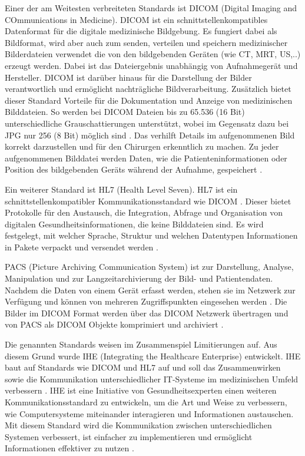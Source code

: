 Einer der am Weitesten verbreiteten Standards ist DICOM (Digital Imaging and COmmunications in Medicine). DICOM ist ein schnittstellenkompatibles Datenformat für die digitale medizinische Bildgebung. Es fungiert dabei als Bildformat, wird aber auch zum senden, verteilen und speichern medizinischer Bilderdateien verwendet die von den bildgebenden Geräten (wie CT, MRT, US,..) erzeugt werden. Dabei ist das Dateiergebnis unabhängig von Aufnahmegerät und Hersteller. DICOM ist darüber hinaus für die Darstellung der Bilder verantwortlich und ermöglicht nachträgliche Bildverarbeitung. Zusätzlich bietet dieser Standard Vorteile für die Dokumentation und Anzeige von medizinischen Bilddateien. So werden bei DICOM Dateien bis zu 65.536 (16 Bit) unterschiedliche Grauschattierungen unterstützt, wobei im Gegensatz dazu bei JPG nur 256 (8 Bit) möglich sind \cite{DICOM}. Das verhilft Details im aufgenommenen Bild korrekt darzustellen und für den Chirurgen erkenntlich zu machen. Zu jeder aufgenommenen Bilddatei werden Daten, wie die Patienteninformationen oder Position des bildgebenden Geräts während der Aufnahme, gespeichert \cite{DICOM}.

Ein weiterer Standard ist HL7 (Health Level Seven). HL7 ist ein schnittstellenkompatibler Kommunikationsstandard wie DICOM \cite{DerDigitaleOperationssaal}. Dieser bietet Protokolle für den Austausch, die Integration, Abfrage und Organisation von digitalen Gesundheitsinformationen, die keine Bilddateien sind. Es wird festgelegt, mit welcher Sprache, Struktur und welchen Datentypen Informationen in Pakete verpackt und versendet werden \cite{HL7}.

PACS (Picture Archiving Communication System) ist zur Darstellung, Analyse, Manipulation und zur Langzeitarchivierung der Bild- und Patientendaten. Nachdem die Daten von einem Gerät erfasst werden, stehen sie im Netzwerk zur Verfügung und können von mehreren Zugriffspunkten eingesehen werden \cite{PACS}.
Die Bilder im DICOM Format werden über das DICOM Netzwerk übertragen und von PACS als DICOM Objekte komprimiert und archiviert \cite{DICOM}.

Die genannten Standards weisen im Zusammenspiel Limitierungen auf. Aus diesem Grund wurde IHE (Integrating the Healthcare Enterprise) entwickelt. IHE baut auf Standards wie DICOM und HL7 auf und soll das Zusammenwirken sowie die Kommunikation unterschiedlicher IT-Systeme im medizinischen Umfeld verbessern \cite{DICOMundIHE}. 
IHE ist eine Initiative von Gesundheitsexperten einen weiteren Kommunikationsstandard zu entwickeln, um die Art und Weise zu verbessern, wie Computersysteme miteinander interagieren und Informationen austauschen. Mit diesem Standard wird die Kommunikation zwischen unterschiedlichen Systemen verbessert, ist einfacher zu implementieren und ermöglicht Informationen effektiver zu nutzen \cite{IHE}.

